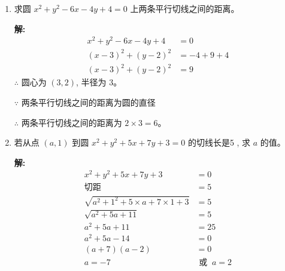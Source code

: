 \documentclass[10pt]{article}
\newcommand{\sol}{\textbf{解:} }
\begin{document}
\begin{enumerate}[leftmargin=*]
  \item 求圆 $x^{2}+y^{2}-6 x-4 y+4=0$ 上两条平行切线之间的距离。

        \sol{}
        \begin{align*}
          x^2 + y^2 - 6x - 4y + 4 & = 0          \\
          (x-3)^2 + (y-2)^2       & = -4 + 9 + 4 \\
          (x-3)^2 + (y-2)^2       & = 9
        \end{align*}
        $\therefore$ 圆心为 $(3, 2)$, 半径为 $3$。

        $\because$ 两条平行切线之间的距离为圆的直径

        $\therefore$ 两条平行切线之间的距离为 $2 \times 3 = 6$。

        \newpage
  \item 若从点 $(a, 1)$ 到圆 $x^{2}+y^{2}+5 x+7 y+3=0$ 的切线长是5 , 求 $a$ 的值。

        \sol{}
        \begin{align*}
          x^{2}+y^{2}+5 x+7 y+3                              & = 0               \\
          \text{切距}                                          & = 5               \\
          \sqrt{a^{2} + 1^{2} + 5 \times a + 7 \times 1 + 3} & = 5               \\
          \sqrt{a^{2} + 5a + 11}                             & = 5               \\
          a^{2} + 5a + 11                                    & = 25              \\
          a^{2} + 5a - 14                                    & = 0               \\
          (a + 7)(a - 2)                                     & = 0               \\
          a = -7                                             & \text{ 或 }\ a = 2
        \end{align*}
\end{enumerate}


\end{document}
